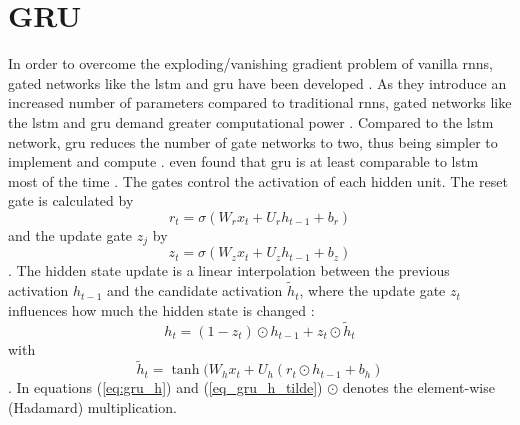 \documentclass[12pt, a4paper, headinclude, twoside, plainheadsepline, open=right, numbers=noenddot, hidelinks, toc=listof, toc=bibliography]{scrreprt}
\begin{document}
\section{GRU}
\label{sec:gru}
In order to overcome the exploding/vanishing gradient problem of vanilla \acp{rnn}, gated networks like the \ac{lstm} \cite{hochreiterLongShortTermMemory1997} and \ac{gru} \cite{choLearningPhraseRepresentations2014} have been developed \cite{vanhoudtReviewLongShortterm2020}.
As they introduce an increased number of parameters compared to traditional \acp{rnn}, gated networks like the \ac{lstm} and \ac{gru} demand greater computational power \cite{deyGatevariantsGatedRecurrent2017}.
Compared to the \ac{lstm} network, \ac{gru} reduces the number of gate networks to two, thus being simpler to implement and compute \cite{choLearningPhraseRepresentations2014}.
 even found that \ac{gru} is at least comparable to \ac{lstm} most of the time \cite{chungEmpiricalEvaluationGated2014}.
The gates control the activation of each hidden unit.
The reset gate is calculated by
\begin{equation}
\label{eq:gru_reset}
r_t = \sigma (W_r x_t + U_r h_{t-1} + b_r)
\end{equation}
and the update gate $z_j$ by
\begin{equation}
\label{eq:gru_update}
z_t = \sigma (W_z x_t + U_z h_{t-1} + b_z)
\end{equation}
\cite{deyGatevariantsGatedRecurrent2017}.
The hidden state update is a linear interpolation between the previous activation $h_{t-1}$ and the candidate activation $\tilde{h}_t$, where the update gate $z_t$ influences how much the hidden state is changed \cite{chungEmpiricalEvaluationGated2014}:
\begin{equation}
\label{eq:gru_h}
h_t = (1-z_t) \odot h_{t-1} + z_t \odot \tilde{h}_t
\end{equation}
with
\begin{equation}
\label{eq_gru_h_tilde}
\tilde{h}_t = \tanh(W_h x_t + U_h (r_t \odot h_{t-1} + b_h)
\end{equation}
.
In equations (\ref{eq:gru_h}) and (\ref{eq_gru_h_tilde}) $\odot$ denotes the element-wise (Hadamard) multiplication.
\end{document}
